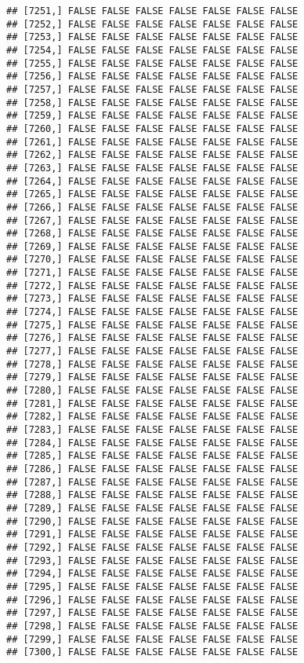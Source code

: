 \documentclass[
]{article}
\begin{document}
\begin{verbatim}
## [7251,] FALSE FALSE FALSE FALSE FALSE FALSE FALSE
## [7252,] FALSE FALSE FALSE FALSE FALSE FALSE FALSE
## [7253,] FALSE FALSE FALSE FALSE FALSE FALSE FALSE
## [7254,] FALSE FALSE FALSE FALSE FALSE FALSE FALSE
## [7255,] FALSE FALSE FALSE FALSE FALSE FALSE FALSE
## [7256,] FALSE FALSE FALSE FALSE FALSE FALSE FALSE
## [7257,] FALSE FALSE FALSE FALSE FALSE FALSE FALSE
## [7258,] FALSE FALSE FALSE FALSE FALSE FALSE FALSE
## [7259,] FALSE FALSE FALSE FALSE FALSE FALSE FALSE
## [7260,] FALSE FALSE FALSE FALSE FALSE FALSE FALSE
## [7261,] FALSE FALSE FALSE FALSE FALSE FALSE FALSE
## [7262,] FALSE FALSE FALSE FALSE FALSE FALSE FALSE
## [7263,] FALSE FALSE FALSE FALSE FALSE FALSE FALSE
## [7264,] FALSE FALSE FALSE FALSE FALSE FALSE FALSE
## [7265,] FALSE FALSE FALSE FALSE FALSE FALSE FALSE
## [7266,] FALSE FALSE FALSE FALSE FALSE FALSE FALSE
## [7267,] FALSE FALSE FALSE FALSE FALSE FALSE FALSE
## [7268,] FALSE FALSE FALSE FALSE FALSE FALSE FALSE
## [7269,] FALSE FALSE FALSE FALSE FALSE FALSE FALSE
## [7270,] FALSE FALSE FALSE FALSE FALSE FALSE FALSE
## [7271,] FALSE FALSE FALSE FALSE FALSE FALSE FALSE
## [7272,] FALSE FALSE FALSE FALSE FALSE FALSE FALSE
## [7273,] FALSE FALSE FALSE FALSE FALSE FALSE FALSE
## [7274,] FALSE FALSE FALSE FALSE FALSE FALSE FALSE
## [7275,] FALSE FALSE FALSE FALSE FALSE FALSE FALSE
## [7276,] FALSE FALSE FALSE FALSE FALSE FALSE FALSE
## [7277,] FALSE FALSE FALSE FALSE FALSE FALSE FALSE
## [7278,] FALSE FALSE FALSE FALSE FALSE FALSE FALSE
## [7279,] FALSE FALSE FALSE FALSE FALSE FALSE FALSE
## [7280,] FALSE FALSE FALSE FALSE FALSE FALSE FALSE
## [7281,] FALSE FALSE FALSE FALSE FALSE FALSE FALSE
## [7282,] FALSE FALSE FALSE FALSE FALSE FALSE FALSE
## [7283,] FALSE FALSE FALSE FALSE FALSE FALSE FALSE
## [7284,] FALSE FALSE FALSE FALSE FALSE FALSE FALSE
## [7285,] FALSE FALSE FALSE FALSE FALSE FALSE FALSE
## [7286,] FALSE FALSE FALSE FALSE FALSE FALSE FALSE
## [7287,] FALSE FALSE FALSE FALSE FALSE FALSE FALSE
## [7288,] FALSE FALSE FALSE FALSE FALSE FALSE FALSE
## [7289,] FALSE FALSE FALSE FALSE FALSE FALSE FALSE
## [7290,] FALSE FALSE FALSE FALSE FALSE FALSE FALSE
## [7291,] FALSE FALSE FALSE FALSE FALSE FALSE FALSE
## [7292,] FALSE FALSE FALSE FALSE FALSE FALSE FALSE
## [7293,] FALSE FALSE FALSE FALSE FALSE FALSE FALSE
## [7294,] FALSE FALSE FALSE FALSE FALSE FALSE FALSE
## [7295,] FALSE FALSE FALSE FALSE FALSE FALSE FALSE
## [7296,] FALSE FALSE FALSE FALSE FALSE FALSE FALSE
## [7297,] FALSE FALSE FALSE FALSE FALSE FALSE FALSE
## [7298,] FALSE FALSE FALSE FALSE FALSE FALSE FALSE
## [7299,] FALSE FALSE FALSE FALSE FALSE FALSE FALSE
## [7300,] FALSE FALSE FALSE FALSE FALSE FALSE FALSE

\end{verbatim}
\end{document}
